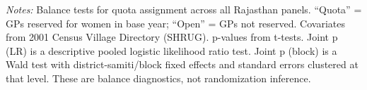 \begin{table}[htbp]
\vspace{0.5ex}
\parbox{\linewidth}{\scriptsize \emph{Notes:} Balance tests for quota assignment across all Rajasthan panels. ``Quota'' = GPs reserved for women in base year; ``Open'' = GPs not reserved. Covariates from 2001 Census Village Directory (SHRUG). p-values from t-tests. Joint p (LR) is a descriptive pooled logistic likelihood ratio test. Joint p (block) is a Wald test with district-samiti/block fixed effects and standard errors clustered at that level. These are balance diagnostics, not randomization inference.}
\end{table}
